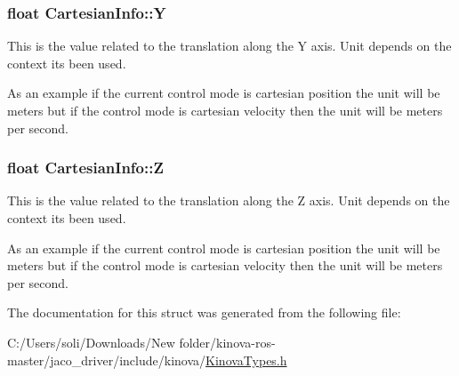 \subsubsection[{\texorpdfstring{Y}{Y}}]{\setlength{\rightskip}{0pt plus 5cm}float Cartesian\+Info\+::Y}\hypertarget{struct_cartesian_info_a12c2611c89445419b336e58815d87c7c}{}\label{struct_cartesian_info_a12c2611c89445419b336e58815d87c7c}


This is the value related to the translation along the Y axis. Unit depends on the context it\textquotesingle{}s been used. 

As an example if the current control mode is cartesian position the unit will be meters but if the control mode is cartesian velocity then the unit will be meters per second. 
\subsubsection[{\texorpdfstring{Z}{Z}}]{\setlength{\rightskip}{0pt plus 5cm}float Cartesian\+Info\+::Z}\hypertarget{struct_cartesian_info_a14e196e4cb38c0ae7f4658b9b070b7fe}{}\label{struct_cartesian_info_a14e196e4cb38c0ae7f4658b9b070b7fe}


This is the value related to the translation along the Z axis. Unit depends on the context it\textquotesingle{}s been used. 

As an example if the current control mode is cartesian position the unit will be meters but if the control mode is cartesian velocity then the unit will be meters per second. 

The documentation for this struct was generated from the following file\+:\begin{DoxyCompactItemize}
\item 
C\+:/\+Users/soli/\+Downloads/\+New folder/kinova-\/ros-\/master/jaco\+\_\+driver/include/kinova/\hyperlink{_kinova_types_8h}{Kinova\+Types.\+h}\end{DoxyCompactItemize}
